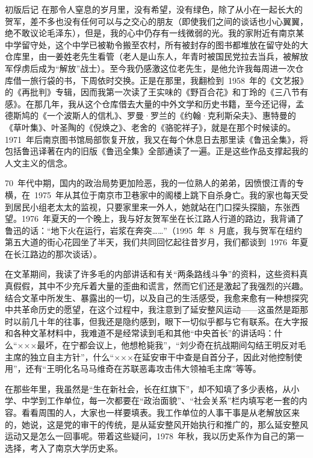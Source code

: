\begin{pre-post-text}{初版后记}
在那令人窒息的岁月里，没有希望，没有绿色，除了从小在一起长大的贺军，差不多也没有任何可以与之交心的朋友（即使我们之间的谈话也小心翼翼，绝不敢议论毛泽东），但是，我的心中仍存有一线微弱的光。我的家附近有南京某中学留守处，这个中学已被勒令搬至农村，所有被封存的图书都堆放在留守处的大仓库里，由一姜姓老先生看管（老人是山东人，年青时被国民党拉去当兵，被解放军俘虏后成为“解放”战士）。至今我仍感激这位老先生，是他允许我每周进一次仓库借一旅行袋的书，下周依时交换。正是在那里，我翻检到~1958~年的《文艺报》的《再批判》专辑，因而我第一次读了王实味的《野百合花》和丁玲的《三八节有感》。在那几年，我从这个仓库借去大量的中外文学和历史书籍，至今还记得，孟德斯鸠的《一个波斯人的信札》、罗曼·罗兰的《约翰·克利斯朵夫》、惠特曼的《草叶集》、叶圣陶的《倪焕之》、老舍的《骆驼祥子》，就是在那个时候读的。1971~年后南京图书馆局部恢复开放，我又在每个休息日去那里读《鲁迅全集》，将包括鲁迅译著在内的旧版《鲁迅全集》全部通读了一遍。正是这些作品支撑起我的人文主义的信念。

70~年代中期，国内的政治局势更加险恶，我的一位熟人的弟弟，因愤恨江青的专横，在~1975~年从其位于南京市卫巷家中的阁楼上跳下自杀身亡。我的家也每天受到居民小组老太太的监视，只要家里来一外人，她就站在门口探头探脑，东张西望。1976~年夏天的一个晚上，我与好友贺军坐在长江路人行道的路边，我背诵了鲁迅的话：“地下火在运行，岩浆在奔突……”（1995~年~8~月底，我与贺军在纽约第五大道的街心花园坐了半天，我们共同回忆起往昔岁月，我们都谈到~1976~年夏在长江路边的那次谈话）。

在文革期间，我读了许多毛的内部讲话和有关“两条路线斗争”的资料，这些资料真真假假，其中不少充斥着大量的歪曲和谎言，然而它们还是激起了我强烈的兴趣。结合文革中所发生、暴露出的一切，以及自己的生活感受，我愈来愈有一种想探究中共革命历史的愿望，在这个过程中，我注意到了延安整风运动——这虽然是距那时以前几十年的往事，但我还是隐约感到，眼下一切似乎都与它有联系。在大字报和各种文革材料中，我难道不是经常读到毛和其他“中央首长”的讲话吗：什么“×××最坏，在宁都会议上，他想枪毙我”，“刘少奇在抗战期间勾结王明反对毛主席的独立自主方针”，什么“×××在延安审干中查是自首分子，因此对他控制使用”，还有“王明化名马马维奇在苏联恶毒攻击伟大领袖毛主席”等等。

在那些年里，我虽然是“生在新社会，长在红旗下”，却不知填了多少表格，从小学、中学到工作单位，每一次都要在“政治面貌”、“社会关系”栏内填写老一套的内容。看看周围的人，大家也一样要填表。我工作单位的人事干事是从老解放区来的，她说，这是党的审干的传统，是从延安整风开始执行和推广的，那么延安整风运动又是怎么一回事呢。带着这些疑问，1978~年秋，我以历史系作为自己的第一选择，考入了南京大学历史系。


\end{pre-post-text}
